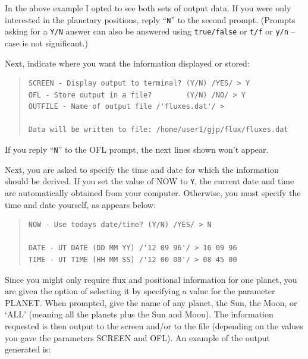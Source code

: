 \documentclass[11pt,twoside]{article}
\newenvironment{myquote}{\begin{quote}\begin{small}}{\end{small}\end{quote}}
\renewcommand{\_}{\texttt{\symbol{95}}}
\begin{document}
In the above example I opted to see both sets of output data.
If you were only interested in the planetary positions, reply ``{\tt{N}}''
to the second prompt.
(Prompts asking for a {\tt{Y/N}} answer can also be answered using
{\tt{true/false}} or {\tt{t/f}} or {\tt{y/n}} --
case is not significant.)

Next, indicate where you want the information displayed or stored:

\begin{myquote}
\begin{verbatim}
SCREEN - Display output to terminal? (Y/N) /YES/ > Y
OFL - Store output in a file?        (Y/N) /NO/ > Y
OUTFILE - Name of output file /'fluxes.dat'/ >

Data will be written to file: /home/user1/gjp/flux/fluxes.dat
\end{verbatim}
\end{myquote}

If you reply ``{\tt{N}}'' to the OFL prompt, the next lines shown won't appear.

Next, you are asked to specify the time and date for which the information
should be derived.
If you set the value of NOW to {\tt{Y}}, the current date
and time are automatically obtained from your computer.
Otherwise, you must specify the time and date yourself, as appears below:

\begin{myquote}
\begin{verbatim}
NOW - Use todays date/time? (Y/N) /YES/ > N

DATE - UT DATE (DD MM YY) /'12 09 96'/ > 16 09 96
TIME - UT TIME (HH MM SS) /'12 00 00'/ > 08 45 00
\end{verbatim}
\end{myquote}

Since you might only require flux and positional information for one planet,
you are given the option of selecting it by specifying a value for the
parameter PLANET.
When prompted, give the name of any planet, the Sun, the Moon,
or `ALL' (meaning all the planets plus the Sun and Moon).
The information requested is then output to the screen and/or to the file
(depending on the values you gave the parameters SCREEN and OFL).
An example of the output generated is:
\end{document}
